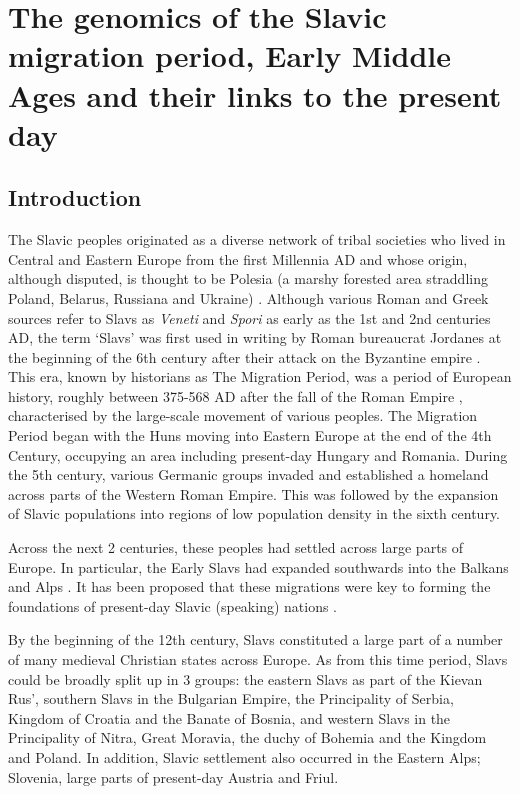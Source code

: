 \chapter{The genomics of the Slavic migration period, Early Middle Ages and their links to the present day}
\label{chapterlabel5}

\section{Introduction}

The Slavic peoples originated as a diverse network of tribal societies who lived in Central and Eastern Europe from the first Millennia AD \cite{barford2001early} and whose origin, although disputed, is thought to be Polesia (a marshy forested area straddling Poland, Belarus, Russiana and Ukraine) \cite{fouracre1995new}. Although various Roman and Greek sources refer to Slavs as \textit{Veneti} and \textit{Spori} as early as the 1st and 2nd centuries AD, the term `Slavs' was first used in writing by Roman bureaucrat Jordanes at the beginning of the 6th century after their attack on the Byzantine empire \cite{curta2006southeastern}. This era, known by historians as The Migration Period, was a period of European history, roughly between 375-568 AD after the fall of the Roman Empire \cite{halsall2007barbarian}, characterised by the large-scale movement of various peoples. The Migration Period began with the Huns moving into Eastern Europe at the end of the 4th Century, occupying an area including present-day Hungary and Romania. During the 5th century, various Germanic groups invaded and established a homeland across parts of the Western Roman Empire. This was followed by the expansion of Slavic populations into regions of low population density in the sixth century.

Across the next 2 centuries, these peoples had settled across large parts of Europe. In particular, the Early Slavs had expanded southwards into the Balkans and Alps \cite{barford2001early, brather2008archaologie, geary2003myth,gojda1991ancient}. It has been proposed that these migrations were key to forming the foundations of present-day Slavic (speaking) nations \cite{barford2001early}.  

By the beginning of the 12th century, Slavs constituted a large part of a number of many medieval Christian states across Europe. As from this time period, Slavs could be broadly split up in 3 groups: the eastern Slavs as part of the Kievan Rus', southern Slavs in the Bulgarian Empire, the Principality of Serbia, Kingdom of Croatia and the Banate of Bosnia, and western Slavs in the Principality of Nitra, Great Moravia, the duchy of Bohemia and the Kingdom and Poland. In addition, Slavic settlement also occurred in the Eastern Alps; Slovenia, large parts of present-day Austria and Friul. 

